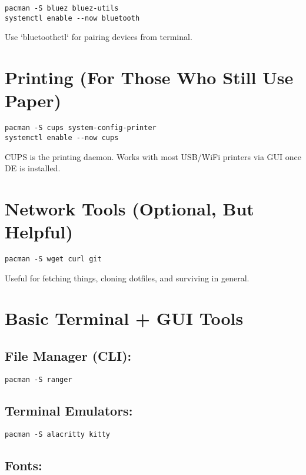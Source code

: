\documentclass[12pt,openany]{book}
\begin{document}
\begin{lstlisting}
pacman -S bluez bluez-utils
systemctl enable --now bluetooth
\end{lstlisting}

Use `bluetoothctl` for pairing devices from terminal.

\section{Printing (For Those Who Still Use Paper)}

\begin{lstlisting}
pacman -S cups system-config-printer
systemctl enable --now cups
\end{lstlisting}

CUPS is the printing daemon. Works with most USB/WiFi printers via GUI once DE is installed.

\section{Network Tools (Optional, But Helpful)}

\begin{lstlisting}
pacman -S wget curl git
\end{lstlisting}

Useful for fetching things, cloning dotfiles, and surviving in general.

\section{Basic Terminal + GUI Tools}

\subsection*{File Manager (CLI):}

\begin{lstlisting}
pacman -S ranger
\end{lstlisting}

\subsection*{Terminal Emulators:}

\begin{lstlisting}
pacman -S alacritty kitty
\end{lstlisting}

\subsection*{Fonts:}
\end{document}
